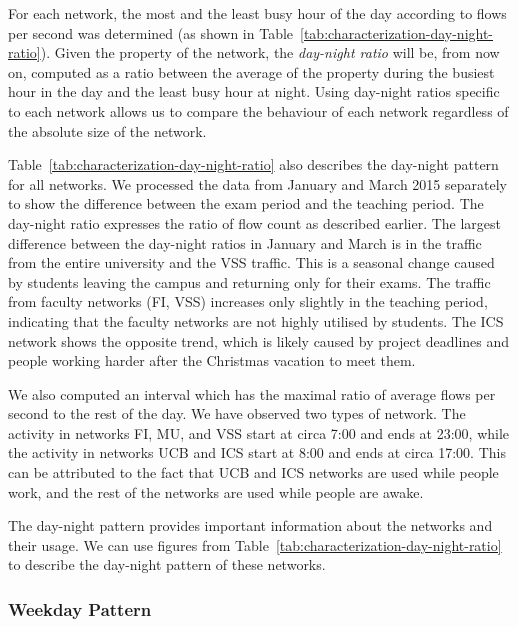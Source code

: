 For each network, the most and the least busy hour of the day according to flows per second was determined (as shown in Table~\ref{tab:characterization-day-night-ratio}). Given the property of the network, the \textit{day-night ratio} will be, from now on, computed as a ratio between the average of the property during the busiest hour in the day and the least busy hour at night. Using day-night ratios specific to each network allows us to compare the behaviour of each network regardless of the absolute size of the network. 

Table~\ref{tab:characterization-day-night-ratio} also describes the day-night pattern for all networks. We processed the data from January and March 2015 separately to show the difference between the exam period and the teaching period. The day-night ratio expresses the ratio of flow count as described earlier. The largest difference between the day-night ratios in January and March is in the traffic from the entire university and the VSS traffic. This is a seasonal change caused by students leaving the campus and returning only for their exams. The traffic from faculty networks (FI, VSS) increases only slightly in the teaching period, indicating that the faculty networks are not highly utilised by students. The ICS network shows the opposite trend, which is likely caused by project deadlines and people working harder after the Christmas vacation to meet them.

We also computed an interval which has the maximal ratio of average flows per second to the rest of the day. We have observed two types of network. The activity in networks FI, MU, and VSS start at circa 7:00 and ends at 23:00, while the activity in networks UCB and ICS start at 8:00 and ends at circa 17:00. This can be attributed to the fact that UCB and ICS networks are used while people work, and the rest of the networks are used while people are awake.

The day-night pattern provides important information about the networks and their usage. We can use figures from Table~\ref{tab:characterization-day-night-ratio} to describe the day-night pattern of these networks.

\subsubsection{Weekday Pattern}

